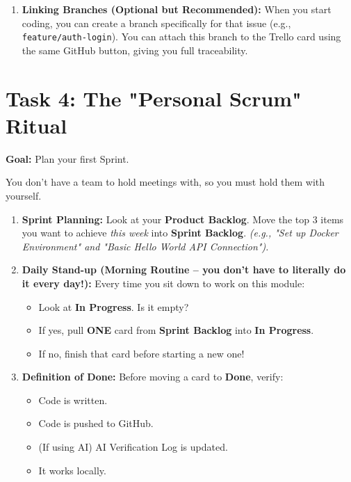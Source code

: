 \documentclass[a4paper,12pt]{article}
\begin{document}
\begin{enumerate}
    \item \textbf{Linking Branches (Optional but Recommended):}
    When you start coding, you can create a branch specifically for that issue (e.g., \texttt{feature/auth-login}). You can attach this branch to the Trello card using the same GitHub button, giving you full traceability.
\end{enumerate}


\section*{Task 4: The "Personal Scrum" Ritual}

\textbf{Goal:} Plan your first Sprint.

\noindent You don't have a team to hold meetings with, so you must hold them with yourself.

\begin{enumerate}
    \item \textbf{Sprint Planning:}
    Look at your \textbf{Product Backlog}. Move the top 3 items you want to achieve \textit{this week} into \textbf{Sprint Backlog}.
    \textit{(e.g., "Set up Docker Environment" and "Basic Hello World API Connection").}
    
    \item \textbf{Daily Stand-up (Morning Routine -- you don't have to literally do it every day!):}
    Every time you sit down to work on this module:
    \begin{itemize}
        \item Look at \textbf{In Progress}. Is it empty?
        \item If yes, pull \textbf{ONE} card from \textbf{Sprint Backlog} into \textbf{In Progress}.
        \item If no, finish that card before starting a new one!
    \end{itemize}
    
    \item \textbf{Definition of Done:}
    Before moving a card to \textbf{Done}, verify:
    \begin{itemize}
        \item [ ] Code is written.
        \item [ ] Code is pushed to GitHub.
        \item [ ] (If using AI) AI Verification Log is updated.
        \item [ ] It works locally.
    \end{itemize}
\end{enumerate}
\end{document}
